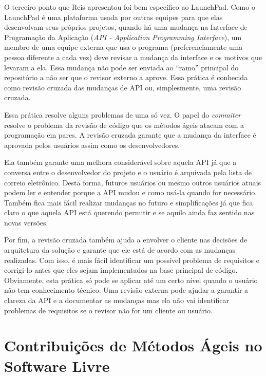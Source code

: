 O terceiro ponto que Reis apresentou foi bem específico ao
LaunchPad. Como o LaunchPad é uma plataforma usada por outras equipes
para que elas desenvolvam seus próprios projetos, quando há uma
mudança na Interface de Programação da Aplicação (\emph{API -
  Application Programming Interface}), um membro de uma equipe externa
que usa o programa (preferenciamente uma pessoa diferente a cada vez)
deve revisar a mudança da interface e os motivos que levaram a
ela. Essa mudança não pode ser enviada ao ``ramo'' principal do
repositório a não ser que o revisor externo a aprove. Essa prática é
conhecida como revisão cruzada das mudanças de API ou, simplesmente,
uma revisão cruzada.

Essa prática resolve alguns problemas de uma só vez. O papel do
\emph{commiter} resolve o problema da revisão de código que os métodos
ágeis atacam com a programação em pares. A revisão cruzada garante que
a mudança da interface é aprovada pelos usuários assim como os
desenvolvedores.

Ela também garante uma melhora considerável sobre aquela API já que a
conversa entre o desenvolvedor do projeto e o usuário é arquivada pela
lista de correio eletrônico. Desta forma, futuros usuários ou mesmo
outros usuários atuais podem ler e entender porque a API mudou e como
usá-la quando for necessário. Também fica mais fácil realizar mudanças
no futuro e simplificações já que fica claro o que aquela API está
querendo permitir e se aquilo ainda faz sentido nas novas versões.

Por fim, a revisão cruzada também ajuda a envolver o cliente nas
decisões de arquitetura da solução e garante que ele está de acordo
com as mudanças realizadas. Com isso, é mais fácil identificar um
possível problema de requisitos e corrigi-lo antes que eles sejam
implementados na base principal de código. Obviamente, esta prática só
pode se aplicar até um certo nível quando o usuário não tem
conhecimento técnico. Uma revisão externa pode ajudar a garantir a
clareza da API e a documentar as mudanças mas ela não vai identificar
problemas de requisitos se o revisor não for um cliente ou usuário.


\section{Contribuições de Métodos Ágeis no Software Livre}
\label{sec:agile-improve-os}

